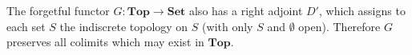 The forgetful functor $G: \mathbf{Top} \to \mathbf{Set}$ also has a right adjoint $D'$, which assigns to each set $S$ the indiscrete topology on $S$ (with only $S$ and $\emptyset$ open). Therefore $G$ preserves all colimits which may exist in $\mathbf{Top}$.

